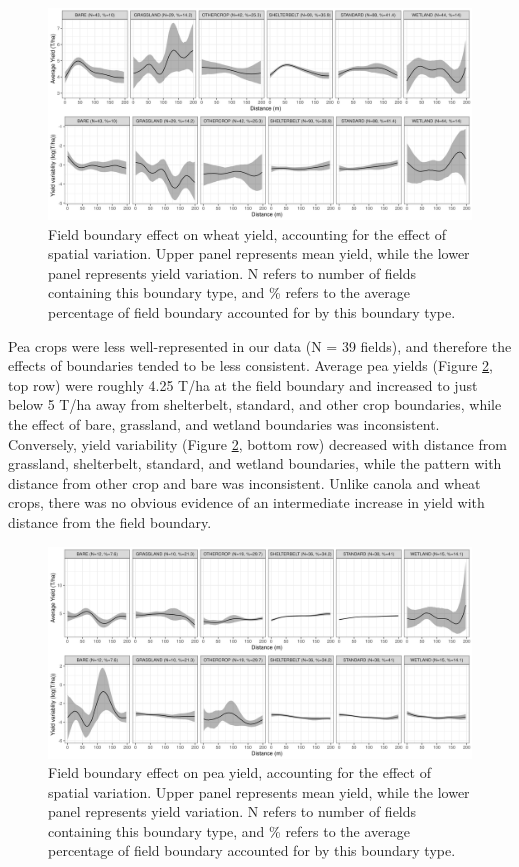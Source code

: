 \documentclass[]{elsarticle} %
\begin{document}
\begin{figure}
\includegraphics[width=1\linewidth]{../Figures/ModelSummary3a_wheat} \caption{Field boundary effect on wheat yield, accounting for the effect of spatial variation. Upper panel represents mean yield, while the lower panel represents yield variation. N refers to number of fields containing this boundary type, and \% refers to the average percentage of field boundary accounted for by this boundary type.}\label{fig:wheatPlot}
\end{figure}

Pea crops were less well-represented in our data (N = 39 fields), and therefore the effects of boundaries tended to be less consistent.
Average pea yields (Figure \ref{fig:peaPlot}, top row) were roughly 4.25 T/ha at the field boundary and increased to just below 5 T/ha away from shelterbelt, standard, and other crop boundaries, while the effect of bare, grassland, and wetland boundaries was inconsistent.
Conversely, yield variability (Figure \ref{fig:peaPlot}, bottom row) decreased with distance from grassland, shelterbelt, standard, and wetland boundaries, while the pattern with distance from other crop and bare was inconsistent.
Unlike canola and wheat crops, there was no obvious evidence of an intermediate increase in yield with distance from the field boundary.

\begin{figure}
\includegraphics[width=1\linewidth]{../Figures/ModelSummary3a_peas} \caption{Field boundary effect on pea yield, accounting for the effect of spatial variation. Upper panel represents mean yield, while the lower panel represents yield variation. N refers to number of fields containing this boundary type, and \% refers to the average percentage of field boundary accounted for by this boundary type.}\label{fig:peaPlot}
\end{figure}
\end{document}
